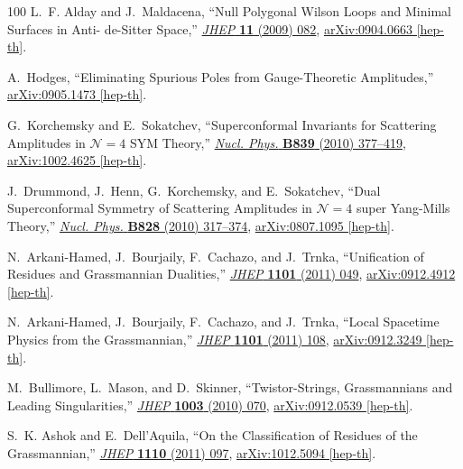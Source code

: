 \documentclass[12pt,hyperref,compress]{JHEP3}
\begin{document}
\begin{thebibliography}{100}
L.~F. Alday and J.~Maldacena, ``{Null Polygonal Wilson Loops and Minimal
  Surfaces in Anti- de-Sitter Space},''
  \href{http://dx.doi.org/10.1088/1126-6708/2009/11/082}{{\em JHEP} {\bf 11}
  (2009)  082},
\href{http://arxiv.org/abs/0904.0663}{{ arXiv:0904.0663 [hep-th]}}.

A.~Hodges, ``{Eliminating Spurious Poles from Gauge-Theoretic Amplitudes},''
\href{http://arxiv.org/abs/0905.1473}{{ arXiv:0905.1473 [hep-th]}}.

G.~Korchemsky and E.~Sokatchev, ``{Superconformal {I}nvariants for {S}cattering
  {A}mplitudes in $\mathcal{N}\!=\!4$ SYM {T}heory},''
  \href{http://dx.doi.org/10.1016/j.nuclphysb.2010.05.022}{{\em Nucl. Phys.}
  {\bf B839} (2010)  377--419},
\href{http://arxiv.org/abs/1002.4625}{{ arXiv:1002.4625 [hep-th]}}.

J.~Drummond, J.~Henn, G.~Korchemsky, and E.~Sokatchev, ``{Dual Superconformal
  Symmetry of Scattering Amplitudes in $\mathcal{N}\!=\!4$ super Yang-Mills
  Theory},'' \href{http://dx.doi.org/10.1016/j.nuclphysb.2009.11.022}{{\em
  Nucl. Phys.} {\bf B828} (2010)  317--374},
\href{http://arxiv.org/abs/0807.1095}{{ arXiv:0807.1095 [hep-th]}}.

N.~Arkani-Hamed, J.~Bourjaily, F.~Cachazo, and J.~Trnka, ``{Unification of
  Residues and Grassmannian Dualities},''
  \href{http://dx.doi.org/10.1007/JHEP01(2011)049}{{\em JHEP} {\bf 1101} (2011)
   049},
\href{http://arxiv.org/abs/0912.4912}{{ arXiv:0912.4912 [hep-th]}}.

N.~Arkani-Hamed, J.~Bourjaily, F.~Cachazo, and J.~Trnka, ``{Local Spacetime
  Physics from the Grassmannian},''
  \href{http://dx.doi.org/10.1007/JHEP01(2011)108}{{\em JHEP} {\bf 1101} (2011)
   108},
\href{http://arxiv.org/abs/0912.3249}{{ arXiv:0912.3249 [hep-th]}}.

M.~Bullimore, L.~Mason, and D.~Skinner, ``{Twistor-Strings, Grassmannians and
  Leading Singularities},''
  \href{http://dx.doi.org/10.1007/JHEP03(2010)070}{{\em JHEP} {\bf 1003} (2010)
   070},
\href{http://arxiv.org/abs/0912.0539}{{ arXiv:0912.0539 [hep-th]}}.

S.~K. Ashok and E.~Dell'Aquila, ``{On the Classification of Residues of the
  Grassmannian},'' \href{http://dx.doi.org/10.1007/JHEP10(2011)097}{{\em JHEP}
  {\bf 1110} (2011)  097},
\href{http://arxiv.org/abs/1012.5094}{{ arXiv:1012.5094 [hep-th]}}.


\end{thebibliography}
\end{document}

